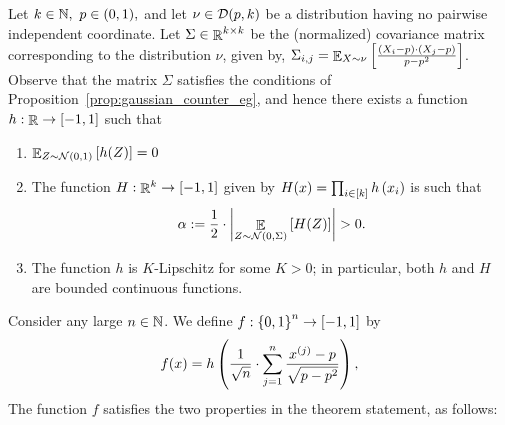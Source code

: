 Let $k\in \mathbb{N},\ p\in (0,1),$ and let $\nu \in \mathcal D(p,k)$ be a distribution having no pairwise independent coordinate.
Let $\Sigma \in \mathop{\mathbb{R}}^{k\times k}$ be the (normalized) covariance matrix corresponding to the distribution $\nu$, given by, $\Sigma_{i,j} = \mathop{\mathbb{E}}_{X\sim \nu}\left[ \frac{ \left( X_i-p \right)\cdot \left( X_j-p \right)}{p-p^2} \right]$.
Observe that the matrix $\Sigma$ satisfies the conditions of Proposition~\ref{prop:gaussian_counter_eg}, and hence there exists a function $h:\mathop{\mathbb{R}}\to [-1,1]$ such that
\begin{enumerate}
	\item $\mathop{\mathbb{E}}_{Z\sim \mathcal N(0,1)}\left[ h(Z) \right] = 0$
	\item The function $H:\mathop{\mathbb{R}}^k\to [-1,1]$ given by $H(x) = \prod_{i\in [k]}h\left( x_i \right)$ is such that \[\alpha :=  \frac{1}{2}\cdot \left|\mathop{\mathbb{E}}_{Z\sim \mathcal N(0, \Sigma)} \left[ H(Z) \right]\right| > 0 .\]
	\item The function $h$ is $K$-Lipschitz for some $K>0$; in particular, both $h$ and $H$ are bounded continuous functions.
\end{enumerate}

Consider any large $n\in \mathbb{N}$.
We define $f:\left\{ 0,1 \right\}^n \to [-1,1]$ by 
\[f(x) = h\left( \frac{1}{\sqrt{n}}\cdot \sum_{j=1}^n \frac{x^{\left( j \right)}-p}{\sqrt{p-p^2}} \right),\]
The function $f$ satisfies the two properties in the theorem statement, as follows:

